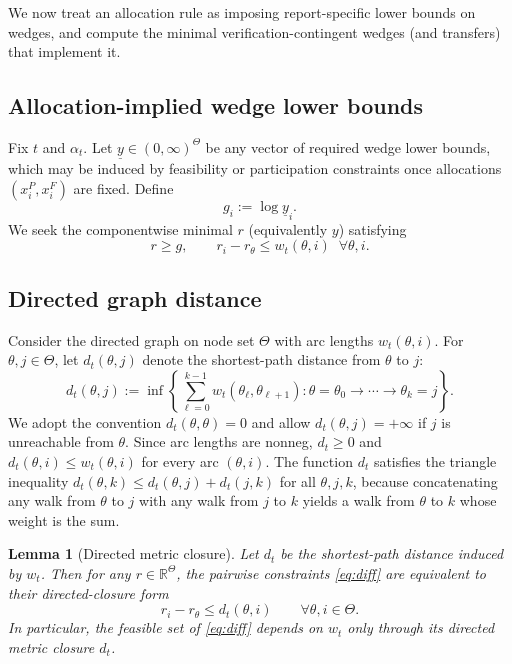 \documentclass[final,3p,times]{elsarticle}
\theoremstyle{plain}
\newtheorem{lemma}{Lemma}
\theoremstyle{definition}
\newcommand{\R}{\mathbb{R}}
\newcommand{\1}{\mathbbm{1}}
\newcommand{\ThetaSet}{\Theta}
\begin{document}
We now treat an allocation rule as imposing report-specific lower bounds on wedges, and compute the minimal verification-contingent wedges (and transfers) that implement it.

\subsection{Allocation-implied wedge lower bounds}

Fix $t$ and $\alpha_t$. Let $\underline y\in (0,\infty)^{\ThetaSet}$ be any vector of required wedge lower bounds, which may be induced by feasibility or participation constraints once allocations $(x_i^P,x_i^F)$ are fixed. Define 
\[
g_i:=\log \underline y_i.
\]
We seek the componentwise minimal $r$ (equivalently $y$) satisfying
\begin{equation}\label{eq:feas-r}
r\ge g,\qquad r_i-r_\theta\le w_t(\theta,i)\;\; \forall \theta,i.
\end{equation}

\subsection{Directed graph distance}

Consider the directed graph on node set $\ThetaSet$ with arc lengths $w_t(\theta,i)$. For $\theta,j\in\ThetaSet$, let $d_t(\theta,j)$ denote the shortest-path distance from $\theta$ to $j$:
\[
d_t(\theta,j):=\inf\left\{\sum_{\ell=0}^{k-1} w_t(\theta_\ell,\theta_{\ell+1}) : \theta=\theta_0\to\cdots\to\theta_k=j \right\}.
\]
We adopt the convention $d_t(\theta,\theta)=0$ and allow $d_t(\theta,j)=+\infty$ if $j$ is unreachable from $\theta$. Since arc lengths are nonneg, $d_t\ge 0$ and $d_t(\theta,i)\le w_t(\theta,i)$ for every arc $(\theta,i)$. The function $d_t$ satisfies the triangle inequality $d_t(\theta,k)\le d_t(\theta,j)+d_t(j,k)$ for all $\theta,j,k$, because concatenating any walk from $\theta$ to $j$ with any walk from $j$ to $k$ yields a walk from $\theta$ to $k$ whose weight is the sum.

\begin{lemma}[Directed metric closure]\label{lem:closure}
Let $d_t$ be the shortest-path distance induced by $w_t$. Then for any $r\in\R^{\ThetaSet}$,
the pairwise constraints \eqref{eq:diff} are equivalent to their directed-closure form
\begin{equation}\label{eq:metric-closure}
r_i-r_\theta \le d_t(\theta,i)\qquad \forall \theta,i\in\ThetaSet.
\end{equation}
In particular, the feasible set of \eqref{eq:diff} depends on $w_t$ only through its directed metric
closure $d_t$.
\end{lemma}
\end{document}
